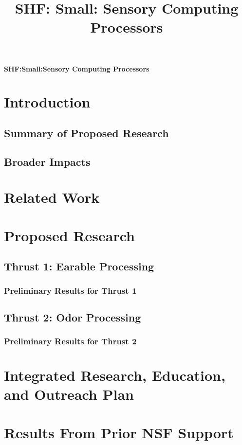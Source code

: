 \documentclass[11 pt]{article}
\title{SHF: Small: Sensory Computing Processors}
\begin{document}
\begin{center}
{\Large \textbf{SHF:Small:Sensory Computing Processors}}
\end{center}

\section{Introduction}


\subsection{Summary of Proposed Research}
\label{ssec:summary}


\subsection{Broader Impacts}


\section{Related Work}


\section{Proposed Research}


\subsection{Thrust 1: Earable Processing}
\label{sec:tract1}
\label{ssec:research1}


\subsubsection{Preliminary Results for Thrust 1}
\label{ssec:prelim1}


\subsection{Thrust 2: Odor Processing}
\label{sec:tract2}
\label{ssec:research2}


\subsubsection{Preliminary Results for Thrust 2}
\label{ssec:prelim2}


\section{Integrated Research, Education, and Outreach Plan}
\label{sec:irep}
\label{irep}

\section{Results From Prior NSF Support}
\label{sec:prior_nsf}

\end{document}
